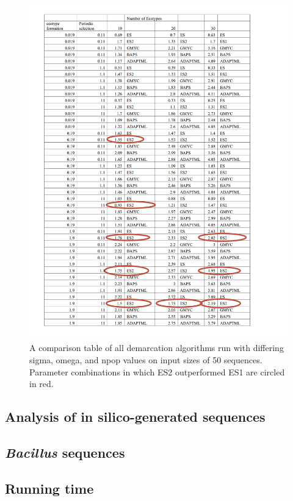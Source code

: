 \begin{figure}[h!]
  \caption{A comparison table of all demarcation algorithms run with differing sigma, omega, and npop values on input sizes of 50 sequences. Parameter combinations in which ES2 outperformed ES1 are circled in red.}
  \centering
    \includegraphics{ComparisonTable1.png}
\end{figure}

\subsection{Analysis of in silico-generated sequences}
\subsection{\emph{Bacillus} sequences}
\subsection{Running time}